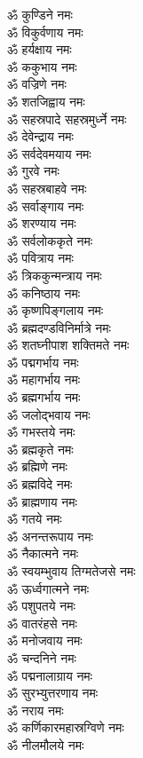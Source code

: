 \begin{multicols}{2}
\begin{flushleft}
ॐ कुण्डिने नमः\\
ॐ विकुर्वणाय नमः\\
ॐ हर्यक्षाय नमः\\
ॐ ककुभाय नमः\\
ॐ वज्रिणे नमः\\
ॐ शतजिह्वाय नमः\\
ॐ सहस्रपादे सहस्रमुर्ध्ने नमः\\
ॐ देवेन्द्राय नमः\hfill{}\\
ॐ सर्वदेवमयाय नमः\\
ॐ गुरवे नमः\\
ॐ सहस्रबाहवे नमः\\
ॐ सर्वाङ्गाय नमः\\
ॐ शरण्याय नमः\\
ॐ सर्वलोककृते नमः\\
ॐ पवित्राय नमः\\
ॐ त्रिककुन्मन्त्राय नमः\\
ॐ कनिष्ठाय नमः\\
ॐ कृष्णपिङ्गलाय नमः\hfill{}\\
ॐ ब्रह्मदण्डविनिर्मात्रे नमः\\
ॐ शतघ्नीपाश शक्तिमते नमः\\
ॐ पद्मगर्भाय नमः\\
ॐ महागर्भाय नमः\\
ॐ ब्रह्मगर्भाय नमः\\
ॐ जलोद्भवाय नमः\\
ॐ गभस्तये नमः\\
ॐ ब्रह्मकृते नमः\\
ॐ ब्रह्मिणे नमः\\
ॐ ब्रह्मविदे नमः\hfill{}\\
ॐ ब्राह्मणाय नमः\\
ॐ गतये नमः\\
ॐ अनन्तरूपाय नमः\\
ॐ नैकात्मने नमः\\
ॐ स्वयम्भुवाय तिग्मतेजसे नमः\\
ॐ ऊर्ध्वगात्मने नमः\\
ॐ पशुपतये नमः\\
ॐ वातरंहसे नमः\\
ॐ मनोजवाय नमः\\
ॐ चन्दनिने नमः\hfill{}\\
ॐ पद्मनालाग्राय नमः\\
ॐ सुरभ्युत्तरणाय नमः\\
ॐ नराय नमः\\
ॐ कर्णिकारमहास्रग्विणे नमः\\
ॐ नीलमौलये नमः\\

\end{flushleft}
\end{multicols}
